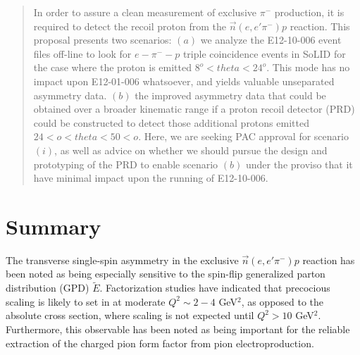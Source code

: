\documentclass{article}
\begin{document}
\begin{abstract}
In order to assure a clean measurement of exclusive $\pi^-$ production, it is
required to detect the recoil proton from the $\vec{n}(e,e'\pi^-)p$ reaction.
This proposal presents two scenarios: $(a)$ we analyze the E12-10-006 event
files off-line to look for $e-\pi^--p$ triple coincidence events in SoLID
for the case where the proton is emitted $8^o<theta<24^o$.  This mode has no
impact upon E12-01-006 whatsoever, and yields valuable unseparated asymmetry
data.  $(b)$ the improved asymmetry data that could be obtained over a broader
kinematic range if a proton recoil detector (PRD) could be constructed to
detect those additional protons emitted $24<o<theta<50<o$.  Here, we are
seeking PAC approval for scenario $(i)$, as well as advice on whether we
should pursue the design and prototyping of the PRD to enable scenario $(b)$
under the proviso that  it have minimal impact upon the running of E12-10-006.

\end{abstract}

\newpage


\newpage


\newpage


\section{Summary}
The transverse single-spin asymmetry in the exclusive $\vec{n}(e,e'\pi^-)p$
reaction has been noted as being
especially sensitive to the spin-flip generalized parton distribution (GPD)
$\tilde{E}$.  Factorization studies have indicated that precocious scaling
is likely to set in at moderate $Q^2\sim 2-4$ GeV$^2$, as opposed to the
absolute cross section, where scaling is not expected until $Q^2>10$ GeV$^2$.
Furthermore, this observable has been noted as being important for the reliable
extraction of the charged pion form factor from pion electroproduction.
\end{document}
